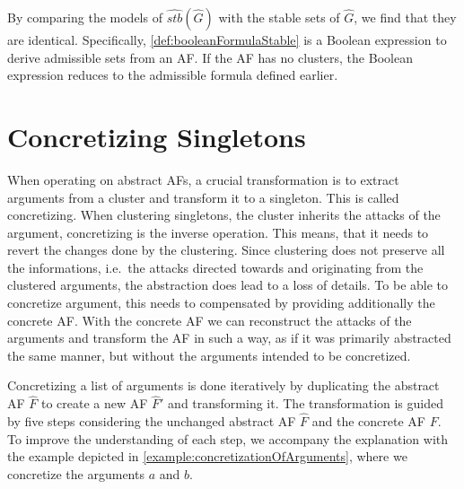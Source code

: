By comparing the models of $\hat{stb}(\hat{G})$ with the stable sets of $\hat{G}$, we find that they are identical. Specifically, \cref{def:booleanFormulaStable} is a Boolean expression to derive admissible sets from an AF. If the AF has no clusters, the Boolean expression reduces to the admissible formula defined earlier.


\section{Concretizing Singletons}
\label{sec:ConcretizingSingletons}
When operating on abstract AFs, a crucial transformation is to extract arguments from a cluster and transform it to a singleton. This is called concretizing. When clustering singletons, the cluster inherits the attacks of the argument, concretizing is the inverse operation. This means, that it needs to revert the changes done by the clustering. Since clustering does not preserve all the informations, i.e.\ the attacks directed towards and originating from the clustered arguments, the abstraction does lead to a loss of details. To be able to concretize argument, this needs to compensated by providing additionally the concrete AF. With the concrete AF we can reconstruct the attacks of the arguments and transform the AF in such a way, as if it was primarily abstracted the same manner, but without the arguments intended to be concretized.

Concretizing a list of arguments is done iteratively by duplicating the abstract AF $\hat{F}$ to create a new AF $\hat{F}'$ and transforming it. The transformation is guided by five steps considering the unchanged abstract AF $\hat{F}$ and the concrete AF $F$. To improve the understanding of each step, we accompany the explanation with the example depicted in \cref{example:concretizationOfArguments}, where we concretize the arguments $a$ and $b$.


